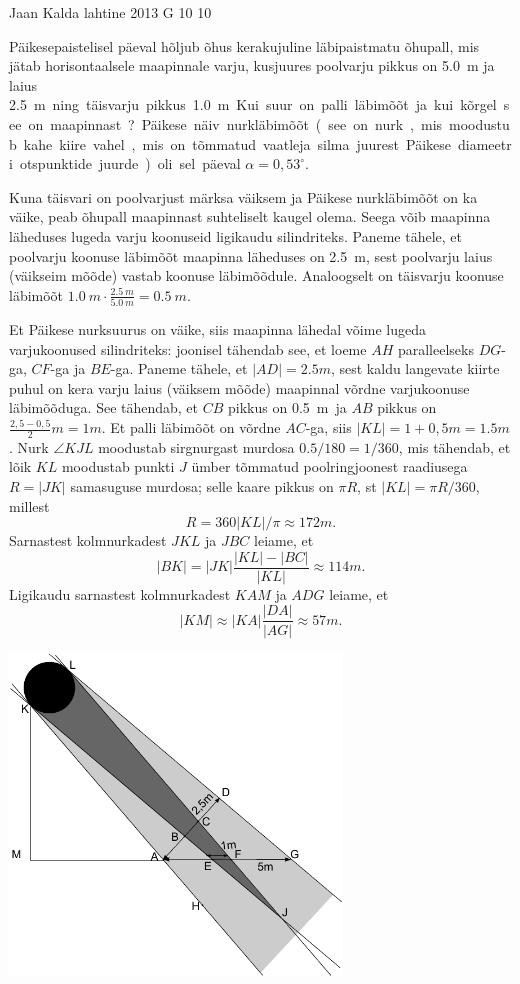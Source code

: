 {Jaan Kalda} %
{lahtine} %
{2013} %
{G 10} %
{10} %
{
\ifStatement
Päikesepaistelisel päeval hõljub õhus kerakujuline läbipaistmatu õhupall, mis
jätab horisontaalsele maapinnale varju, kusjuures poolvarju pikkus on \SI{5,0}{m}
ja laius \SI{2,5}m ning täisvarju pikkus \SI{1,0}{m}. Kui suur on palli
läbimõõt ja kui kõrgel see on maapinnast? Päikese näiv nurkläbimõõt (see on nurk, 
mis moodustub kahe kiire vahel, mis on tõmmatud vaatleja silma juurest 
Päikese diameetri otspunktide juurde) oli sel
päeval $\alpha =0,53^\circ$.
\fi


\ifHint
Kuna täisvari on poolvarjust märksa väiksem ja Päikese nurkläbimõõt on ka väike, peab õhupall maapinnast suhteliselt kaugel olema. Seega võib maapinna läheduses lugeda varju koonuseid ligikaudu silindriteks. Paneme tähele, et poolvarju koonuse läbimõõt maapinna läheduses on \SI{2,5}{m}, sest poolvarju laius (väikseim mõõde) vastab koonuse läbimõõdule. Analoogselt on täisvarju koonuse läbimõõt $\SI{1,0}{m}\cdot\frac{\SI{2,5}{m}}{\SI{5,0}{m}} = \SI{0,5}{m}$.
\fi


\ifSolution
Et Päikese nurksuurus on väike, siis maapinna lähedal võime lugeda varjukoonused silindriteks: joonisel tähendab see, et loeme $AH$ paralleelseks $DG$-ga, $CF$-ga ja $BE$-ga.
Paneme tähele, et $|AD|=\SI{2,5}m$, sest kaldu langevate kiirte puhul on kera varju laius (väiksem mõõde) maapinnal võrdne varjukoonuse läbimõõduga.
See tähendab, et $CB$ pikkus on \SI{0,5}m ja $AB$ pikkus on $\frac{2,5-0,5}2\SI{}m=\SI{1}m$. Et palli läbimõõt on võrdne $AC$-ga, siis $|KL|=1+0,5\SI{}m=\SI{1,5}m$.
Nurk $\angle KJL$ moodustab sirgnurgast murdosa $\num{0,5}/180=1/360$, mis tähendab, et lõik $KL$ moodustab punkti $J$ ümber tõmmatud poolringjoonest raadiusega $R=|JK|$
samasuguse murdosa; selle kaare pikkus on $\pi R$, st $|KL|=\pi R /360$, millest 
\[
R=360|KL|/\pi\approx \SI{172}m.
\]
Sarnastest kolmnurkadest $JKL$ ja $JBC$ leiame, et 
\[
|BK|=|JK|\frac{|KL|-|BC|}{|KL|}\approx \SI{114}m.
\]
Ligikaudu sarnastest kolmnurkadest $KAM$ ja $ADG$ leiame, et
\[
|KM|\approx |KA|\frac{|DA|}{|AG|}\approx \SI{57}m.
\]

\begin{center}
\includegraphics[width=250pt]{2013-lahg-10-pxike-pall-vari}%
\end{center}
\fi


}
